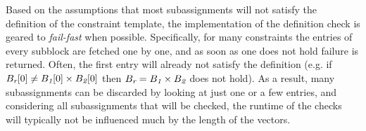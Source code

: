 Based on the assumptions that most subassignments will not satisfy the definition of the constraint template, the implementation of the definition check is geared to \textit{fail-fast} when possible.
Specifically, for many constraints the entries of every subblock are fetched one by one, and as soon as one does not hold failure is returned.
Often, the first entry will already not satisfy the definition (e.g. if $B_{\textit{r}}[0] \neq B_{\textit{1}}[0] \times B_{\textit{2}}[0]$ then $B_{\textit{r}} = B_{\textit{1}} \times B_{\textit{2}}$ does not hold).
As a result, many subassignments can be discarded by looking at just one or a few entries, and considering all subassignments that will be checked, the runtime of the checks will typically not be influenced much by the length of the vectors.






